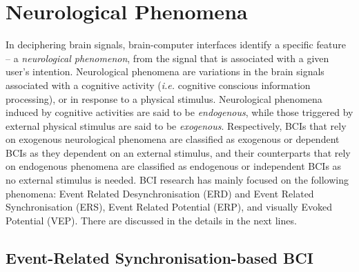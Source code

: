 %
%
\section{Neurological Phenomena}
\label{sec:lit_survey_neuro_phenomena}

In deciphering brain signals, brain-computer interfaces identify a specific feature -- a \emph{neurological phenomenon}, from the signal that is associated with a given user's intention. 
Neurological phenomena are variations in the brain signals associated with a cognitive activity (\textit{i.e.} cognitive conscious information processing),  or in response to a physical stimulus.
Neurological phenomena induced by cognitive activities are said to be \emph{endogenous}, while those triggered by external physical stimulus are said to be \emph{exogenous}.
Respectively, BCIs that rely on exogenous neurological phenomena are classified as exogenous or dependent BCIs as they dependent on an external stimulus, and their counterparts that rely on endogenous phenomena are classified as endogenous or independent BCIs as  no external stimulus is needed.
BCI research has mainly focused on the following phenomena: Event Related Desynchronisation (ERD) and Event Related Synchronisation (ERS), Event Related Potential (ERP), and visually Evoked Potential (VEP). 
There are discussed in the details in the next lines.
\subsection{Event-Related Synchronisation-based BCI}
\label{subsec:ERD/S-BCI}

